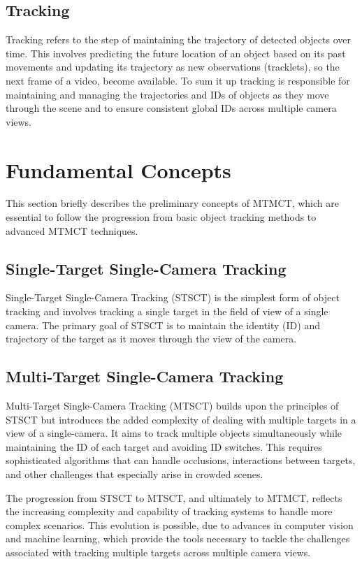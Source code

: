 \subsection{Tracking}\label{subsec:tracking}
Tracking refers to the step of maintaining the trajectory of detected objects over time. This involves predicting the future location of an object based on its past movements and updating its trajectory as new observations (tracklets), so the next frame of a video, become available. To sum it up tracking is responsible for maintaining and managing the trajectories and IDs of objects as they move through the scene and to ensure consistent global IDs across multiple camera views.

\section{Fundamental Concepts}\label{sec:fundamental_concepts}
This section briefly describes the preliminary concepts of MTMCT, which are essential to follow the progression from basic object tracking methods to advanced MTMCT techniques.

\subsection{Single-Target Single-Camera Tracking}\label{subsec:st_sct}
Single-Target Single-Camera Tracking (STSCT) is the simplest form of object tracking and involves tracking a single target in the field of view of a single camera. The primary goal of STSCT is to maintain the identity (ID) and trajectory of the target as it moves through the view of the camera.

\subsection{Multi-Target Single-Camera Tracking}\label{subsec:mt_sct}
Multi-Target Single-Camera Tracking (MTSCT) builds upon the principles of STSCT but introduces the added complexity of dealing with multiple targets in a view of a single-camera. It aims to track multiple objects simultaneously while maintaining the ID of each target and avoiding ID switches. This requires sophisticated algorithms that can handle occlusions, interactions between targets, and other challenges that especially arise in crowded scenes.

The progression from STSCT to MTSCT, and ultimately to MTMCT, reflects the increasing complexity and capability of tracking systems to handle more complex scenarios. This evolution is possible, due to advances in computer vision and machine learning, which provide the tools necessary to tackle the challenges associated with tracking multiple targets across multiple camera views.

